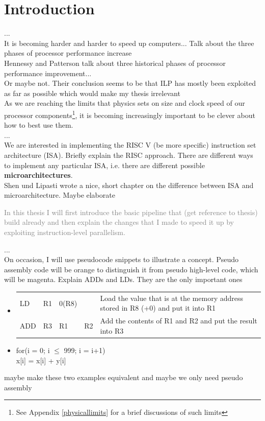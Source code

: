 \documentclass[12pt,a4paper]{article}
\newenvironment {assembly}{\begingroup \ttfamily \color{Orange} \begin{itemize} \item[]}{\end{itemize}\endgroup}
\newenvironment {highcode}{\begingroup \ttfamily \color{Magenta} \begin{itemize} \item[]}{\end{itemize}\endgroup}
\newcommand{\note}{\textcolor{WildStrawberry}}
\newcommand{\greyout}{\textcolor{Gray}}
\newcommand\tab[1][1cm]{\hspace*{#1}}
\begin{document}
\setcounter{page}{1}
\section{Introduction}
...\\
It is becoming harder and harder to speed up computers... \cite[Chapter 42]{Hennessy}
\note{Talk about the three phases of processor performance increase}\\
Hennessy and Patterson talk about three historical phases of processor performance improvement...\\
\note{Or maybe not. Their conclusion seems to be that ILP has mostly been exploited as far as possible which would make my thesis irrelevant}\\
As we are reaching the limits that physics sets on size and clock speed of our processor components\footnote{See Appendix \ref{physicallimits} for a brief discussions of such limits}, it is becoming increasingly important to be clever about how to best use them.\\ 

...\\

We are interested in implementing the RISC V \note{(be more specific)} instruction set architecture (ISA). \note{Briefly explain the RISC approach}. There are different ways to implement any particular ISA, i.e. there are different possible \textbf{microarchitectures}. \\
\note{Shen und Lipasti wrote a nice, short chapter on the difference between ISA and microarchitecture. Maybe elaborate}

\greyout{
In this thesis I will first introduce the basic pipeline that \note{(get reference to thesis)} build already and then explain the changes that I made to speed it up by exploiting instruction-level parallelism.
}

...\\

On occasion, I will use pseudocode snippets to illustrate a concept. Pseudo assembly code will be {\ttfamily\color{Orange}orange} to distinguish it from pseudo high-level code, which will be {\ttfamily \color{Magenta}magenta}. \note{Explain ADDs and LDs. They are the only important ones} 

\begin{assembly}
	\begin{tabularx} {\textwidth} {l a a a X}
		LD 	& R1 & 0(R8)	& \hspace{1cm}	 & Load the value that is at the memory address stored in R8 (+0) and put it into R1 \\
		ADD & R3 & R1		& R2 			 & Add the contents of R1 and R2 and put the result into R3 \\
	\end{tabularx}
\end{assembly}
\begin{highcode}
    for(i = 0; i $\leq$ 999; i = i+1)\\
    \tab x[i] = x[i] + y[i]\\
\end{highcode}
\note{maybe make these two examples equivalent and maybe we only need pseudo assembly}
\end{document}
